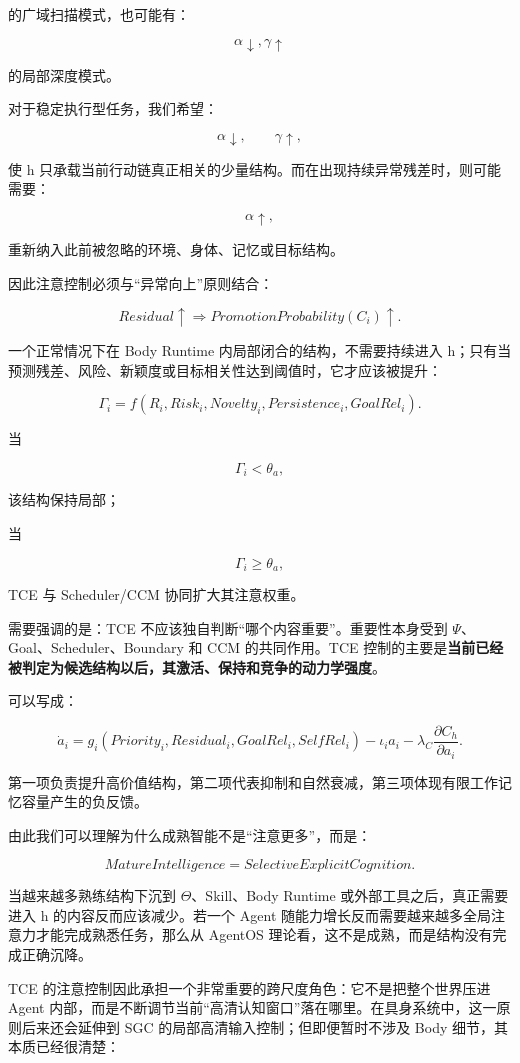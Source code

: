 的广域扫描模式，也可能有：

\[
\alpha\downarrow,\gamma\uparrow
\]

的局部深度模式。

对于稳定执行型任务，我们希望：

\[
\alpha\downarrow,
\qquad
\gamma\uparrow,
\]

使 h 只承载当前行动链真正相关的少量结构。而在出现持续异常残差时，则可能需要：

\[
\alpha\uparrow,
\]

重新纳入此前被忽略的环境、身体、记忆或目标结构。

因此注意控制必须与“异常向上”原则结合：

\[
Residual\uparrow
\Rightarrow
PromotionProbability(C_i)\uparrow.
\]

一个正常情况下在 Body Runtime 内局部闭合的结构，不需要持续进入 h；只有当预测残差、风险、新颖度或目标相关性达到阈值时，它才应该被提升：

\[
\Gamma_i
=
f(
R_i,
Risk_i,
Novelty_i,
Persistence_i,
GoalRel_i
).
\]

当

\[
\Gamma_i<\theta_a,
\]

该结构保持局部；

当

\[
\Gamma_i\ge\theta_a,
\]

TCE 与 Scheduler/CCM 协同扩大其注意权重。

需要强调的是：TCE 不应该独自判断“哪个内容重要”。重要性本身受到 $\Psi$、Goal、Scheduler、Boundary 和 CCM 的共同作用。TCE 控制的主要是\textbf{当前已经被判定为候选结构以后，其激活、保持和竞争的动力学强度}。

可以写成：

\[
\dot a_i
=
g_i
\left(
Priority_i,
Residual_i,
GoalRel_i,
SelfRel_i
\right)
-
\iota_i a_i
-
\lambda_C\frac{\partial C_h}{\partial a_i}.
\]

第一项负责提升高价值结构，第二项代表抑制和自然衰减，第三项体现有限工作记忆容量产生的负反馈。

由此我们可以理解为什么成熟智能不是“注意更多”，而是：

\[
\boxed{
MatureIntelligence
=
SelectiveExplicitCognition.
}
\]

当越来越多熟练结构下沉到 $\Theta$、Skill、Body Runtime 或外部工具之后，真正需要进入 h 的内容反而应该减少。若一个 Agent 随能力增长反而需要越来越多全局注意力才能完成熟悉任务，那么从 AgentOS 理论看，这不是成熟，而是结构没有完成正确沉降。

TCE 的注意控制因此承担一个非常重要的跨尺度角色：它不是把整个世界压进 Agent 内部，而是不断调节当前“高清认知窗口”落在哪里。在具身系统中，这一原则后来还会延伸到 SGC 的局部高清输入控制；但即便暂时不涉及 Body 细节，其本质已经很清楚：

